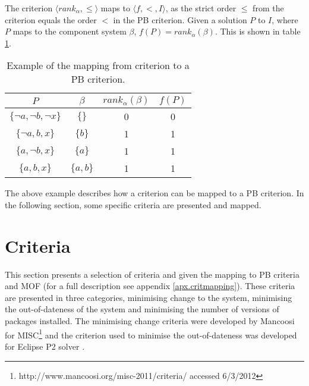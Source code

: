 The criterion $\langle rank_{\alpha}, \leq \rangle$ maps to $\langle f, < , I \rangle$,
as the strict order $\leq$ from the criterion equals the order $<$ in the PB criterion.
Given a solution $P$ to $I$, where $P$ maps to the component system $\beta$, $f(P) = rank_{\alpha}(\beta)$.
This is shown in table \ref{impl.critmapexmp}.
\begin{table}[h!]
\centering
\begin{tabular}{| c | c | c | c |}
\hline
$P$                                &    $\beta$            & $rank_{\alpha}(\beta)$     & $f(P)$\\ \hline    
$\{\neg a, \neg b, \neg x\}$     & $\{\}$                & 0                        & 0 \\
$\{\neg a,  b, x\}$             & $\{b\}$                & 1                        & 1 \\
$\{ a,  \neg b, x\}$             & $\{a\}$                & 1                        & 1 \\
$\{ a,  b, x\}$                 & $\{a,b\}$                & 1                        & 1 \\ \hline
\end{tabular}
\caption{Example of the mapping from \modelname criterion to a PB criterion.}
\label{impl.critmapexmp}
\end{table}

The above example describes how a \modelname criterion can be mapped to a PB criterion.
In the following section, some specific criteria are presented and mapped.

\section{Criteria}
\label{impl.criteria}
This section presents a selection of  \modelname criteria and given the mapping to PB criteria and MOF (for a full description see appendix \ref{apx.critmapping}).
These criteria are presented in three categories, minimising change to the system, minimising the out-of-dateness of the system and minimising the number of versions of packages installed.
The minimising change criteria were developed by Mancoosi for MISC\footnote{http://www.mancoosi.org/misc-2011/criteria/ accessed 6/3/2012}
and the criterion used to minimise the out-of-dateness was developed for Eclipse P2 solver \citep{leBerre2010}.

